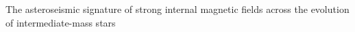 The asteroseismic signature of strong internal magnetic fields across the evolution of intermediate-mass stars
  
  
  
  